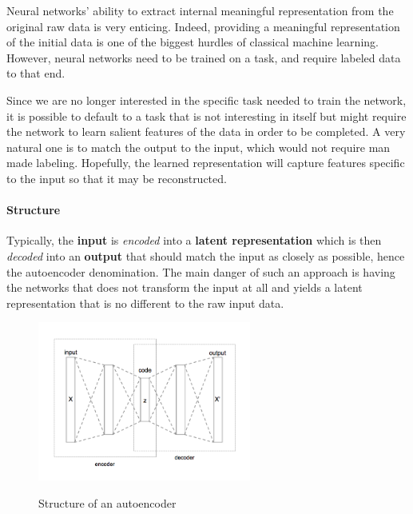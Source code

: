 \documentclass[conference]{IEEEtran}
\begin{document}
Neural networks' ability to extract internal meaningful representation from the
original raw data is very enticing. Indeed, providing a meaningful
representation of the initial data is one of the biggest hurdles of classical
machine learning. However, neural networks need to be trained on a task, and
require labeled data to that end. 

Since we are no longer interested in the specific task needed to train the
network, it is possible to default to a task that is not interesting in itself
but might require the network to learn salient features of the data in order to
be completed. A very natural one is to match the output to the input, which
would not require man made labeling. Hopefully, the learned representation will
capture features specific to the input so that it may be reconstructed.

\paragraph{Structure}

Typically, the \textbf{input} is \textit{encoded} into a \textbf{latent
  representation} which is then \textit{decoded} into an \textbf{output} that
should match the input as closely as possible, hence the autoencoder
denomination. The main danger of such an approach is having the networks that
does not transform the input at all and yields a latent representation that is
no different to the raw input data. 


\begin{figure}[!h]
    \centering
    \caption{Structure of an autoencoder}
    \includegraphics[width=7cm]{Autoencoder_structure.png}
    \label{autoencoder_structure}
\end{figure}
\end{document}
